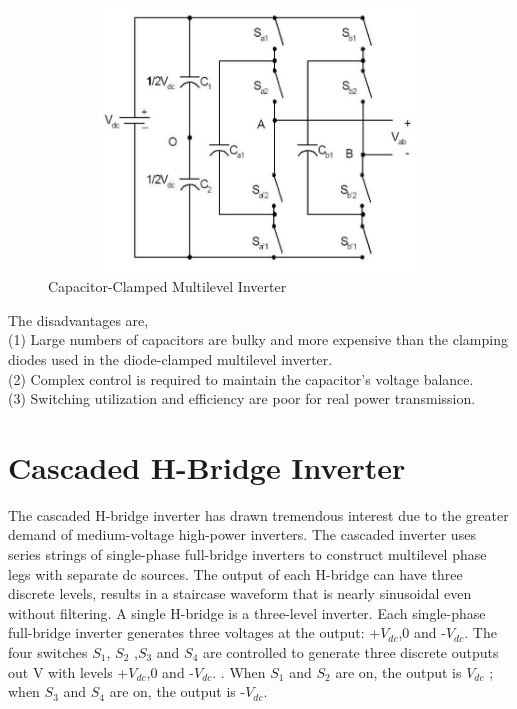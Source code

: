 \documentclass[12pt,a4paper]{report}
\begin{document}
\begin{figure}[h]
	\centering
	\includegraphics[width=12cm,height=7cm]{figures/capac.jpg}
	\caption{Capacitor-Clamped Multilevel Inverter}\label{capacitor}
\end{figure}
\vspace{1.0cm}
The disadvantages are,\\
(1) Large numbers of capacitors are bulky and more expensive
than the clamping diodes used in the diode-clamped
multilevel inverter.\\
(2) Complex control is required to maintain the capacitor’s
voltage balance.\\
(3) Switching utilization and efficiency are poor for real power
transmission.\\

\section{Cascaded H-Bridge Inverter}
The cascaded H-bridge inverter has drawn tremendous interest due
to the greater demand of medium-voltage high-power inverters. The cascaded
inverter uses series strings of single-phase full-bridge inverters to construct
multilevel phase legs with separate dc sources. The output of each H-bridge can have three discrete levels, results
in a staircase waveform that is nearly sinusoidal even without filtering. A
single H-bridge is a three-level inverter. Each single-phase full-bridge
inverter generates three voltages at the output: +$V_{dc}$,0 and -$V_{dc}$.
The four switches $S_{1}$, $S_2$ ,$S_3$ and $S_4$ are controlled to generate three
discrete outputs out V with levels  +$V_{dc}$,0 and -$V_{dc}$. . When $S_1$ and $S_2$ are on, the
output is $V_{dc}$ ; when $S_3$ and $S_4$ are on, the output is -$V_{dc}$.
\end{document}
